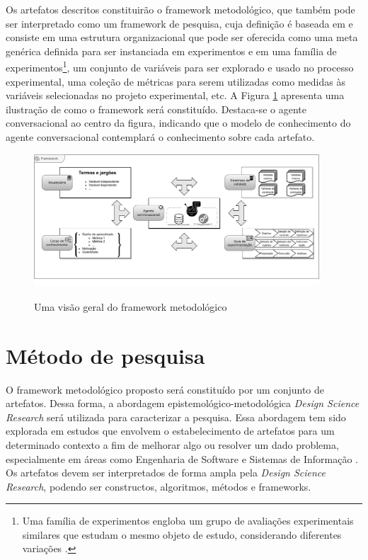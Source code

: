 Os artefatos descritos constituirão o framework metodológico, que também pode ser interpretado como um framework de pesquisa, cuja definição é baseada em  e consiste em uma estrutura organizacional que pode ser oferecida como uma meta genérica definida para ser instanciada em experimentos e em uma família de experimentos\footnote{Uma família de experimentos engloba um grupo de avaliações experimentais similares que estudam o mesmo objeto de estudo, considerando diferentes variações \cite{Basili:1998}.},  um conjunto de variáveis  para  ser explorado e usado no processo experimental, uma coleção de métricas para serem utilizadas como medidas às variáveis selecionadas no projeto experimental, etc. A Figura \ref{framework} apresenta uma ilustração de como o framework será constituído. Destaca-se o agente conversacional ao centro da figura, indicando que o modelo de conhecimento do agente conversacional contemplará o conhecimento sobre cada artefato.

\begin{figure}[!htb]
\centering
\caption{Uma visão geral do framework metodológico}
\includegraphics[width=0.95\textwidth]{Figuras/desenho.pdf}
\label{framework}
\fautor
\end{figure}
 
\section{Método de pesquisa} 

O framework metodológico proposto será constituído por um conjunto de artefatos. Dessa forma, a abordagem epistemológico-metodológica \textit{Design Science Research} será utilizada para caracterizar a pesquisa. Essa abordagem tem sido explorada em estudos que envolvem o estabelecimento de artefatos para um determinado contexto a fim de melhorar algo ou resolver um dado problema, especialmente em áreas como Engenharia de Software e Sistemas de Informação \cite{wieringa2014}. Os artefatos devem ser interpretados de forma ampla pela \textit{Design Science Research}, podendo ser constructos, algoritmos, métodos e frameworks.  

